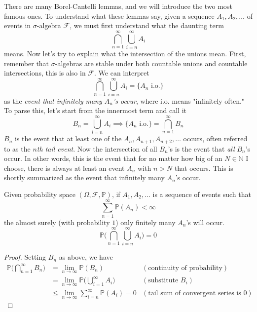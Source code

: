 \documentclass{article}
\begin{document}
    There are many Borel-Cantelli lemmas, and we will introduce the two most famous ones. To understand what these lemmas say, given a sequence $A_1, A_2, \ldots$ of events in $\sigma$-algebra $\mathcal{F}$, we must first understand what the daunting term  
    \begin{equation}
      \bigcap_{n=1}^\infty \bigcup_{i = n}^\infty A_i
    \end{equation}
    means. Now let's try to explain what the intersection of the unions mean. First, remember that $\sigma$-algebras are stable under both countable unions and countable intersections, this is also in $\mathcal{F}$. We can interpret 
    \begin{equation}
      \bigcap_{n=1}^\infty \bigcup_{i=n}^\infty A_i = \{ A_n \text{ i.o.}\}
    \end{equation}
    as the \textit{event that infinitely many $A_n$'s occur}, where i.o. means "infinitely often." To parse this, let's start from the innermost term and call it 
    \begin{equation}
      B_n = \bigcup_{i=n}^\infty A_i \implies \{A_n \text{ i.o.}\} = \bigcap_{n=1}^\infty B_n
    \end{equation}
    $B_n$ is the event that at least one of the $A_n, A_{n+1}, A_{n+2}, \ldots$ occurs, often referred to as the \textit{$n$th tail event}. Now the intersection of all $B_n$'s is the event that \textit{all} $B_n$'s occur. In other words, this is the event that for no matter how big of an $N \in \mathbb{N}$ I choose, there is always at least an event $A_n$ with $n > N$ that occurs. This is shortly summarized as the event that infinitely many $A_n$'s occur. 

    \begin{lemma}
      Given probability space $(\Omega, \mathcal{F}, \mathbb{P})$, if $A_1, A_2, \ldots$ is a sequence of events such that 
      \begin{equation}
        \sum_{n=1}^\infty \mathbb{P}(A_n) < \infty
      \end{equation}
      the almost surely (with probability $1$) only finitely many $A_n$'s will occur. 
      \begin{equation}
        \mathbb{P} \bigg( \bigcap_{n=1}^\infty \bigcup_{i = n}^\infty A_i \bigg) = 0
      \end{equation}
    \end{lemma}
    \begin{proof}
      Setting $B_n$ as above, we have 
      \begin{align*}
        \mathbb{P}\bigg( \bigcap_{n=1}^\infty B_n \bigg) & = \lim_{n \rightarrow \infty} \mathbb{P}(B_n) & (\text{continuity of probability}) \\
        & = \lim_{n \rightarrow \infty} \mathbb{P} \bigg( \bigcup_{i=1}^\infty A_i \bigg) & (\text{substitute } B_i) \\
        & \leq \lim_{n \rightarrow \infty} \sum_{i = n}^\infty \mathbb{P}(A_i) = 0 & (\text{tail sum of convergent series is } 0)
      \end{align*}
    \end{proof}
\end{document}
